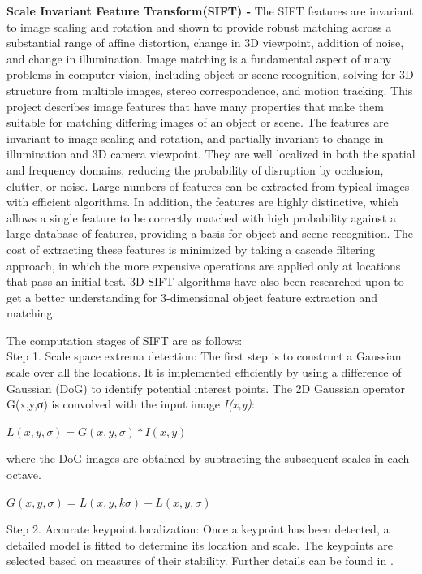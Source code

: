 \textbf{Scale Invariant Feature Transform(SIFT) - } The SIFT features are invariant to image scaling and rotation and shown to provide robust matching across a substantial range of affine distortion, change in 3D viewpoint, addition of noise, and change in illumination. Image matching is a fundamental aspect of many problems in computer vision, including object or scene recognition, solving for 3D structure from multiple images, stereo correspondence, and motion tracking. This project describes image features that have many properties that make them suitable for matching differing images of an object or scene. The features are invariant to image scaling and rotation, and partially invariant to change in illumination and 3D camera viewpoint. They are well localized in both the spatial and frequency domains, reducing the probability of disruption by occlusion, clutter, or noise. Large numbers of features can be extracted from typical images with efficient algorithms. In addition, the features are highly distinctive, which allows a single feature to be correctly matched with high probability against a large database of features, providing a basis for object and scene recognition.
The cost of extracting these features is minimized by taking a cascade filtering approach, in which the more expensive operations are applied only at locations that pass an initial test. 3D-SIFT \cite{3dsift} algorithms have also been researched upon to get a better understanding for 3-dimensional object feature extraction and matching.

 The computation stages of SIFT are as follows: \\
Step 1. Scale space extrema detection: The first step is to construct a Gaussian scale over all the locations. It is implemented efficiently by using a difference of Gaussian (DoG) to identify potential interest points. The 2D Gaussian operator G(x,y,σ) is convolved with the input image \textit{I(x,y)}:
\begin{center}
	$L(x,y,\sigma) = G(x,y,\sigma) * I(x,y)$
\end{center}
where the  DoG images are obtained by subtracting the subsequent scales in each octave.
\begin{center}
	$G(x,y,\sigma) = L(x,y,k\sigma) - L(x,y,\sigma)$
\end{center}

Step 2. Accurate keypoint localization: Once a keypoint has been detected, a detailed model is fitted to determine its location and scale. The keypoints are selected based on measures of their stability. Further details can be found in \cite{alonso2009iris}. 

